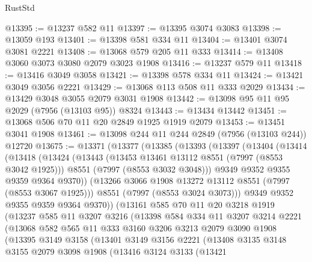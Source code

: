 \begin{lexlean}{RustStd}
\begin{coremodule}
@13395 := @13237 @582 @11
@13397 := @13395 @3074 @3083
@13398 := @13059 @193
@13401 := @13398 @581 @334 @11
@13404 := @13401 @3074 @3081 @2221
@13408 := @13068 @579 @205 @11 @333
@13414 := @13408 @3060 @3073 @3080 @2079 @3023 @1908
@13416 := @13237 @579 @11
@13418 := @13416 @3049 @3058
@13421 := @13398 @578 @334 @11
@13424 := @13421 @3049 @3056 @2221
@13429 := @13068 @113 @508 @11 @333 @2029
@13434 := @13429 @3048 @3055 @2079 @3031 @1908
@13442 := @13098 @95 @11 @95 @2029 (@7956 (@13103 @95)) @8324
@13443 := @13434 @13442
@13451 := @13068 @506 @70 @11 @20 @2849 @1925 @1919 @2079
@13453 := @13451 @3041 @1908
@13461 := @13098 @244 @11 @244 @2849 (@7956 (@13103 @244)) @12720
@13675 := @13371
    (@13377
      (@13385
        (@13393
          (@13397
            (@13404
              (@13414
                (@13418
                  (@13424
                    (@13443
                      (@13453 @13461 @13112 @8551 (@7997 (@8553 @3042 @1925)))
                      @8551
                      (@7997 (@8553 @3032 @3048)))
                    @9349
                    @9352
                    @9355
                    @9359
                    @9364
                    @9370))
                (@13266 @3066 @1908 @13272 @13112 @8551 (@7997 (@8553 @3067 @1925)))
                @8551
                (@7997 (@8553 @3024 @3073)))
              @9349
              @9352
              @9355
              @9359
              @9364
              @9370))
          (@13161
            @585
            @70
            @11
            @20
            @3218
            @1919
            (@13237
              @585
              @11
              @3207
              @3216
              (@13398
                @584
                @334
                @11
                @3207
                @3214
                @2221
                (@13068
                  @582
                  @565
                  @11
                  @333
                  @3160
                  @3206
                  @3213
                  @2079
                  @3090
                  @1908
                  (@13395
                    @3149
                    @3158
                    (@13401
                      @3149
                      @3156
                      @2221
                      (@13408
                        @3135
                        @3148
                        @3155
                        @2079
                        @3098
                        @1908
                        (@13416
                          @3124
                          @3133
                          (@13421

\end{coremodule}
\end{lexlean}
